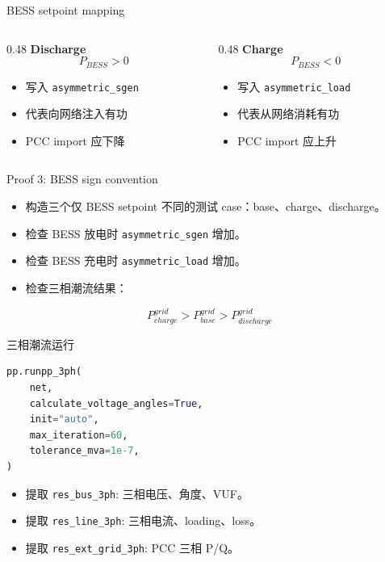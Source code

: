 \documentclass[aspectratio=169,11pt]{beamer}
\begin{document}
\begin{frame}{BESS setpoint mapping}
\begin{columns}
\begin{column}{0.48\textwidth}
\textbf{Discharge}\
\[
P_{BESS}>0
\]
\begin{itemize}
  \item 写入 \texttt{asymmetric\_sgen}
  \item 代表向网络注入有功
  \item PCC import 应下降
\end{itemize}
\end{column}
\begin{column}{0.48\textwidth}
\textbf{Charge}\
\[
P_{BESS}<0
\]
\begin{itemize}
  \item 写入 \texttt{asymmetric\_load}
  \item 代表从网络消耗有功
  \item PCC import 应上升
\end{itemize}
\end{column}
\end{columns}
\end{frame}

\begin{frame}{Proof 3: BESS sign convention}
\begin{itemize}
  \item 构造三个仅 BESS setpoint 不同的测试 case：base、charge、discharge。
  \item 检查 BESS 放电时 \texttt{asymmetric\_sgen} 增加。
  \item 检查 BESS 充电时 \texttt{asymmetric\_load} 增加。
  \item 检查三相潮流结果：
\end{itemize}
\[
P^{grid}_{charge} > P^{grid}_{base} > P^{grid}_{discharge}
\]
\end{frame}

\begin{frame}[fragile]{三相潮流运行}
\begin{lstlisting}[language=Python]
pp.runpp_3ph(
    net,
    calculate_voltage_angles=True,
    init="auto",
    max_iteration=60,
    tolerance_mva=1e-7,
)
\end{lstlisting}
\begin{itemize}
  \item 提取 \texttt{res\_bus\_3ph}: 三相电压、角度、VUF。
  \item 提取 \texttt{res\_line\_3ph}: 三相电流、loading、loss。
  \item 提取 \texttt{res\_ext\_grid\_3ph}: PCC 三相 P/Q。
\end{itemize}
\end{frame}
\end{document}

